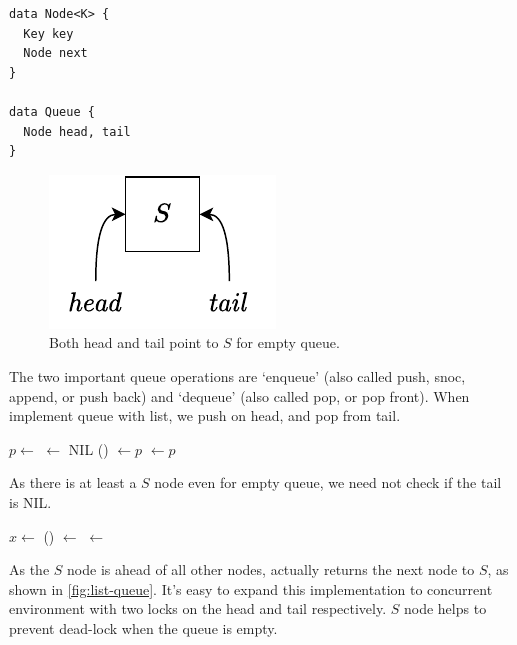 \documentclass[b5paper]{article}
\begin{document}
\lstset{frame = single}
\begin{lstlisting}[language = Bourbaki]
data Node<K> {
  Key key
  Node next
}

data Queue {
  Node head, tail
}
\end{lstlisting}

\begin{figure}[htbp]
  \centering
  \includegraphics[scale=0.6]{img/empty-list}
  \caption{Both head and tail point to $S$ for empty queue.}
  \label{fig:empty-list}
\end{figure}

The two important queue operations are `enqueue' (also called push, snoc, append, or push back) and `dequeue' (also called pop, or pop front). When implement queue with list, we push on head, and pop from tail.

\begin{algorithmic}[1]
  \State $p \gets $ 
  \State {} $\gets$ NIL
  \State {}() $\gets p$
  \State {} $\gets p$
\EndFunction
\end{algorithmic}

As there is at least a $S$ node even for empty queue, we need not check if the tail is NIL.

\begin{algorithmic}[1]
  \State $x \gets $ 
  \State {}() $\gets$ 
   
    \State {} $\gets$ 
  \EndIf
  \State \Return {}
\EndFunction
\end{algorithmic}

As the $S$ node is ahead of all other nodes,  actually returns the next node to $S$, as shown in \cref{fig:list-queue}. It's easy to expand this implementation to concurrent environment with two locks on the head and tail respectively. $S$ node helps to prevent dead-lock when the queue is empty\cite{PODC96}\cite{SutterDDJ}.
\end{document}
